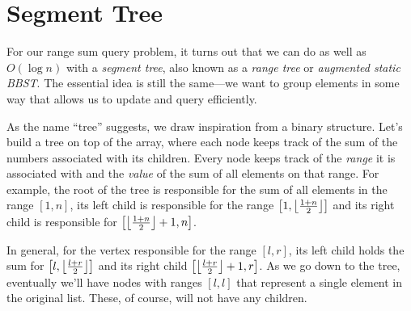\section{Segment Tree}

For our range sum query problem, it turns out that we can do as well as $O(\log{n})$ with a \textit{segment tree}, also known as a \textit{range tree} or \textit{augmented static BBST}. The essential idea is still the same---we want to group elements in some way that allows us to update and query efficiently.

As the name ``tree'' suggests, we draw inspiration from a binary structure. Let's build a tree on top of the array, where each node keeps track of the sum of the numbers associated with its children. Every node keeps track of the \textit{range} it is associated with and the \textit{value} of the sum of all elements on that range. For example, the root of the tree is responsible for the sum of all elements in the range $[1, n]$, its left child is responsible for the range $\left[1, \left\lfloor \frac{1+n}{2} \right\rfloor\right]$ and its right child is responsible for $\left[\left\lfloor \frac{1+n}{2} \right\rfloor + 1, n\right]$.

In general, for the vertex responsible for the range $[l,r]$, its left child holds the sum for $\left[l,\left\lfloor \frac{l+r}{2} \right\rfloor\right]$ and its right child $\left[\left\lfloor \frac{l+r}{2} \right\rfloor+1,r\right]$. As we go down to the tree, eventually we'll have nodes with ranges $[l,l]$ that represent a single element in the original list. These, of course, will not have any children.

